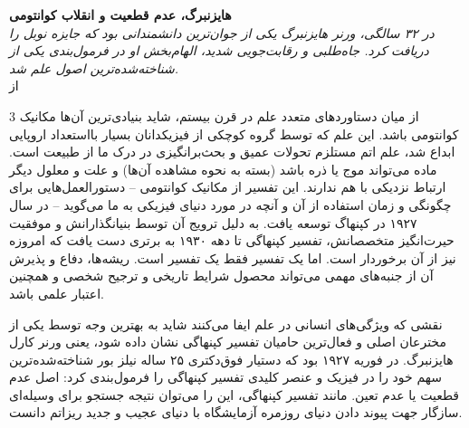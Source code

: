\documentclass[11pt,a4paper]{article}
\begin{document}
\begin{center}
    {\Huge \textbf{هایزنبرگ، عدم قطعیت و انقلاب کوانتومی}}\\[1.5em]
    
    {\Large \textit{در ۳۲ سالگی، ورنر هایزنبرگ یکی از جوان‌ترین دانشمندانی بود که جایزه نوبل را دریافت کرد. جاه‌طلبی و رقابت‌جویی شدید، الهام‌بخش او در فرمول‌بندی یکی از شناخته‌شده‌ترین اصول علم شد.}}\\[1.5em]
    
    {\large از }
\end{center}

\vspace{1.5em}

\setlength{\columnsep}{0.8cm}

\begin{multicols}{3}
\noindent از میان دستاوردهای متعدد علم در قرن بیستم، شاید بنیادی‌ترین آن‌ها مکانیک کوانتومی باشد. این علم که توسط گروه کوچکی از فیزیکدانان بسیار بااستعداد اروپایی ابداع شد، علم اتم مستلزم تحولات عمیق و بحث‌برانگیزی در درک ما از طبیعت است. ماده می‌تواند موج یا ذره باشد (بسته به نحوه مشاهده آن‌ها) و علت و معلول دیگر ارتباط نزدیکی با هم ندارند. این تفسیر از مکانیک کوانتومی -- دستورالعمل‌هایی برای چگونگی و زمان استفاده از آن و آنچه در مورد دنیای فیزیکی به ما می‌گوید -- در سال ۱۹۲۷ در کپنهاگ توسعه یافت. به دلیل ترویج آن توسط بنیانگذارانش و موفقیت حیرت‌انگیز متخصصانش، تفسیر کپنهاگی تا دهه ۱۹۳۰ به برتری دست یافت که امروزه نیز از آن برخوردار است. اما یک تفسیر فقط یک تفسیر است. ریشه‌ها، دفاع و پذیرش آن از جنبه‌های مهمی می‌تواند محصول شرایط تاریخی و ترجیح شخصی و همچنین اعتبار علمی باشد.

نقشی که ویژگی‌های انسانی در علم ایفا می‌کنند شاید به بهترین وجه توسط یکی از مخترعان اصلی و فعال‌ترین حامیان تفسیر کپنهاگی نشان داده شود، یعنی ورنر کارل هایزنبرگ. در فوریه ۱۹۲۷ بود که دستیار فوق‌دکتری ۲۵ ساله نیلز بور شناخته‌شده‌ترین سهم خود را در فیزیک و عنصر کلیدی تفسیر کپنهاگی را فرمول‌بندی کرد: اصل عدم قطعیت یا عدم تعین. مانند تفسیر کپنهاگی، این را می‌توان نتیجه جستجو برای وسیله‌ای سازگار جهت پیوند دادن دنیای روزمره آزمایشگاه با دنیای عجیب و جدید ریزاتم دانست.

\vspace{1em}
\noindent{}
\vspace{1em}


\end{multicols}
\end{document}
